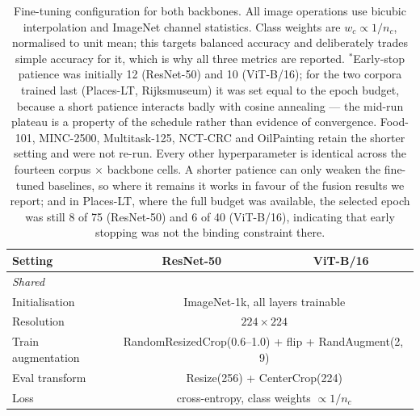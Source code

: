 %
\begin{table}[t]
\centering
\caption{Fine-tuning configuration for both backbones. All image operations use
bicubic interpolation and ImageNet channel statistics. Class weights are
$w_c \propto 1/n_c$, normalised to unit mean; this targets balanced accuracy and
deliberately trades simple accuracy for it, which is why all three metrics are
reported. $^{*}$Early-stop patience was initially 12 (ResNet-50) and 10
(ViT-B/16); for the two corpora trained last (Places-LT, Rijksmuseum) it was set
equal to the epoch budget, because a short patience interacts badly with cosine
annealing --- the mid-run plateau is a property of the schedule rather than
evidence of convergence. Food-101, MINC-2500, Multitask-125, NCT-CRC and
OilPainting retain the shorter setting and were not re-run. Every other
hyperparameter is identical across the fourteen corpus $\times$ backbone cells.
A shorter patience can only weaken the fine-tuned baselines, so where it remains
it works in favour of the fusion results we report; and in Places-LT, where the
full budget was available, the selected epoch was still 8 of 75 (ResNet-50) and
6 of 40 (ViT-B/16), indicating that early stopping was not the binding
constraint there.}
\label{tab:finetune-hparams}
\small
\setlength{\tabcolsep}{4pt}
\begin{tabular}{lcc}
\toprule
\textbf{Setting} & \textbf{ResNet-50} & \textbf{ViT-B/16} \\
\midrule
\multicolumn{3}{l}{\emph{Shared}} \\
Initialisation      & \multicolumn{2}{c}{ImageNet-1k, all layers trainable} \\
Resolution          & \multicolumn{2}{c}{$224 \times 224$} \\
Train augmentation  & \multicolumn{2}{c}{RandomResizedCrop(0.6--1.0) + flip + RandAugment(2,\,9)} \\
Eval transform      & \multicolumn{2}{c}{Resize(256) + CenterCrop(224)} \\
Loss                & \multicolumn{2}{c}{cross-entropy, class weights $\propto 1/n_c$} \\

\end{tabular}
\end{table}

